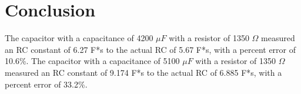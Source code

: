 \documentclass[11pt, titlepage]{article}
\begin{document}
\section*{Conclusion}

The capacitor with a capacitance of 4200 $\mu F$ with a resistor of 1350 $\Omega$ measured an RC constant of 6.27 F*s to the actual RC of 5.67 F*s, with a percent error of 10.6\%. The capacitor with a capacitance of 5100 $\mu F$ with a resistor of 1350 $\Omega$ measured an RC constant of 9.174 F*s to the actual RC of 6.885 F*s, with a percent error of 33.2\%.
\end{document}
